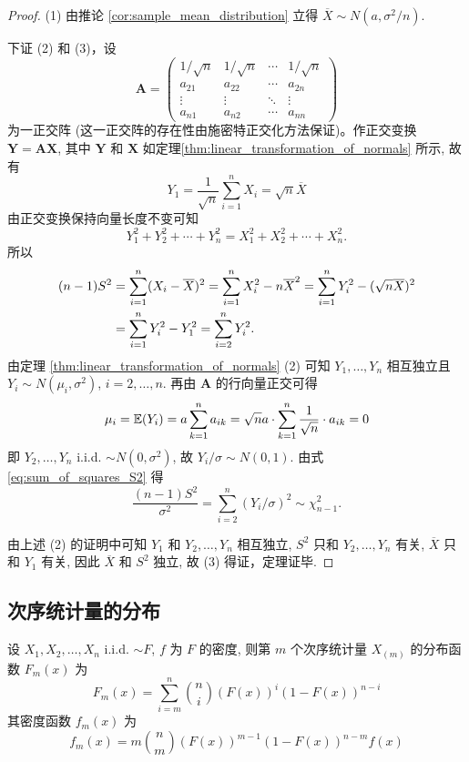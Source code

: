\begin{proof}
(1) 由推论 \ref{cor:sample_mean_distribution} 立得 $\overline{X} \sim N(a, \sigma^2/n)$.

下证 (2) 和 (3)，设
\[
\boldsymbol{A} = \begin{pmatrix}
1/\sqrt{n} & 1/\sqrt{n} & \cdots & 1/\sqrt{n} \\
a_{21} & a_{22} & \cdots & a_{2n} \\
\vdots & \vdots & \ddots & \vdots \\
a_{n1} & a_{n2} & \cdots & a_{nn}
\end{pmatrix}
\]
为一正交阵 (这一正交阵的存在性由施密特正交化方法保证)。作正交变换 $\boldsymbol{Y} = \boldsymbol{A}\boldsymbol{X}$, 其中 $\boldsymbol{Y}$ 和 $\boldsymbol{X}$ 如定理\ref{thm:linear_transformation_of_normals} 所示, 故有
\[
Y_1 = \frac{1}{\sqrt{n}}\sum_{i=1}^n X_i = \sqrt{n}\overline{X}
\]
由正交变换保持向量长度不变可知
\[
Y_1^2 + Y_2^2 + \cdots + Y_n^2 = X_1^2 + X_2^2 + \cdots + X_n^2.
\]
所以
\begin{align}
(n-1)S^2 &= \sum_{i=1}^n (X_i - \overline{X})^2 
= \sum_{i=1}^n X_i^2 - n\overline{X}^2 \notag
= \sum_{i=1}^n Y_i^2 - (\sqrt{n}\overline{X})^2 \notag \\
&= \sum_{i=1}^n Y_i^2 - Y_1^2 
= \sum_{i=2}^n Y_i^2. \label{eq:sum_of_squares_S2}
\end{align}
由定理 \ref{thm:linear_transformation_of_normals} (2) 可知 $Y_1, \ldots, Y_n$ 相互独立且 $Y_i \sim N(\mu_i, \sigma^2)$, $i=2, \ldots, n$. 再由 $\boldsymbol{A}$ 的行向量正交可得
\begin{equation}\label{eq:正交行向量推均值为0}
    \mu_i = \mathbb{E}(Y_i) = a \sum_{k=1}^n a_{ik} = \sqrt{n}a \cdot \sum_{k=1}^{n}\frac{1}{\sqrt{n}}\cdot a_{ik} = 0
\end{equation}
即 $Y_2, \ldots, Y_n$ i.i.d. $\sim N(0, \sigma^2)$, 故 $Y_i/\sigma \sim N(0,1)$.
由式 \eqref{eq:sum_of_squares_S2} 得
\[
\frac{(n-1)S^2}{\sigma^2} = \sum_{i=2}^n (Y_i/\sigma)^2 \sim \chi_{n-1}^2.
\]

由上述 (2) 的证明中可知 $Y_1$ 和 $Y_2, \ldots, Y_n$ 相互独立, $S^2$ 只和 $Y_2, \ldots, Y_n$ 有关, $\overline{X}$ 只和 $Y_1$ 有关, 因此 $\overline{X}$ 和 $S^2$ 独立, 故 (3) 得证，定理证毕.
\end{proof}

\subsection{次序统计量的分布}\label{subsec:次序统计量的分布}
\begin{proposition} \label{prop:single_order_statistic_distribution}
设 $X_1, X_2, \ldots, X_n$ i.i.d. $\sim F$, $f$ 为 $F$ 的密度, 则第 $m$ 个次序统计量 $X_{(m)}$ 的分布函数 $F_m(x)$ 为
\begin{equation} \label{eq:order_statistic_cdf}
F_m(x) = \sum_{i=m}^n \binom{n}{i} (F(x))^i (1-F(x))^{n-i}
\end{equation}
其密度函数 $f_m(x)$ 为
\begin{equation} \label{eq:order_statistic_pdf}
f_m(x) = m \binom{n}{m} (F(x))^{m-1}(1-F(x))^{n-m} f(x)
\end{equation}
\end{proposition}

